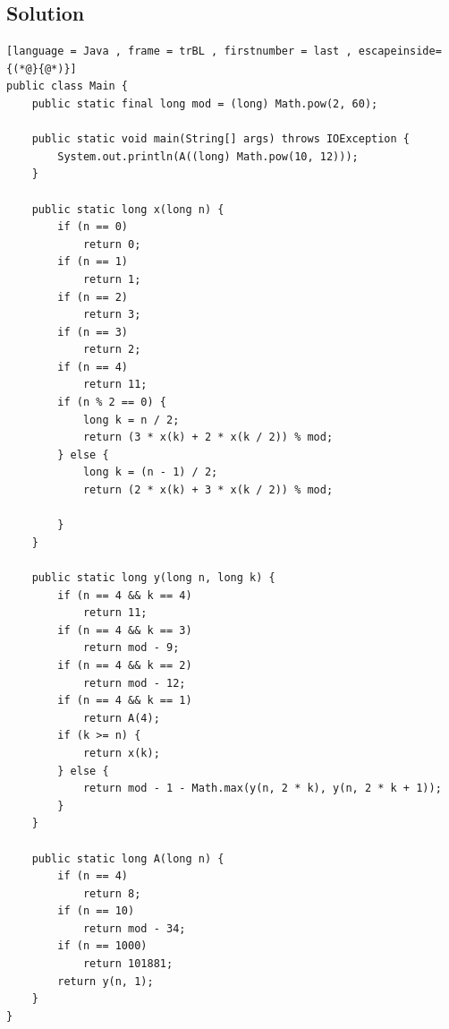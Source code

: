 \documentclass{article}
\begin{document}
\subsection*{Solution}
    \begin{lstlisting}[language = Java , frame = trBL , firstnumber = last , escapeinside={(*@}{@*)}]
public class Main {
	public static final long mod = (long) Math.pow(2, 60);

	public static void main(String[] args) throws IOException {
		System.out.println(A((long) Math.pow(10, 12)));
	}

	public static long x(long n) {
		if (n == 0)
			return 0;
		if (n == 1)
			return 1;
		if (n == 2)
			return 3;
		if (n == 3)
			return 2;
		if (n == 4)
			return 11;
		if (n % 2 == 0) {
			long k = n / 2;
			return (3 * x(k) + 2 * x(k / 2)) % mod;
		} else {
			long k = (n - 1) / 2;
			return (2 * x(k) + 3 * x(k / 2)) % mod;

		}
	}

	public static long y(long n, long k) {
		if (n == 4 && k == 4)
			return 11;
		if (n == 4 && k == 3)
			return mod - 9;
		if (n == 4 && k == 2)
			return mod - 12;
		if (n == 4 && k == 1)
			return A(4);
		if (k >= n) {
			return x(k);
		} else {
			return mod - 1 - Math.max(y(n, 2 * k), y(n, 2 * k + 1));
		}
	}

	public static long A(long n) {
		if (n == 4)
			return 8;
		if (n == 10)
			return mod - 34;
		if (n == 1000)
			return 101881;
		return y(n, 1);
	}
}

\end{lstlisting}
\end{document}
